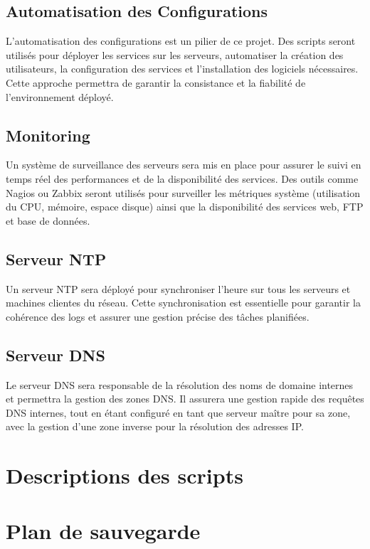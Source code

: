 \documentclass[a4paper, 12pt]{article}
\begin{document}
	\subsection{Automatisation des Configurations}
	L'automatisation des configurations est un pilier de ce projet. Des scripts seront utilisés pour déployer les services sur les serveurs, automatiser la création des utilisateurs, la configuration des services et l'installation des logiciels nécessaires. Cette approche permettra de garantir la consistance et la fiabilité de l'environnement déployé.
	
	\subsection{Monitoring}
	Un système de surveillance des serveurs sera mis en place pour assurer le suivi en temps réel des performances et de la disponibilité des services. Des outils comme Nagios ou Zabbix seront utilisés pour surveiller les métriques système (utilisation du CPU, mémoire, espace disque) ainsi que la disponibilité des services web, FTP et base de données.
	
	\subsection{Serveur NTP}
	Un serveur NTP sera déployé pour synchroniser l'heure sur tous les serveurs et machines clientes du réseau. Cette synchronisation est essentielle pour garantir la cohérence des logs et assurer une gestion précise des tâches planifiées.
	
	\subsection{Serveur DNS}
	Le serveur DNS sera responsable de la résolution des noms de domaine internes et permettra la gestion des zones DNS. Il assurera une gestion rapide des requêtes DNS internes, tout en étant configuré en tant que serveur maître pour sa zone, avec la gestion d'une zone inverse pour la résolution des adresses IP.
	
	
	\section{Descriptions des scripts}
	
	\section{Plan de sauvegarde}
	
\end{document}
